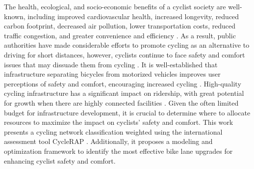 \documentclass[lettersize,journal]{IEEEtran}
\begin{document}
The health, ecological, and socio-economic benefits of a cyclist society are well-known, including improved cardiovascular health, increased longevity, reduced carbon footprint, decreased air pollution, lower transportation costs, reduced traffic congestion, and greater convenience and efficiency \cite{garrard2012health, gotschi2016cycling}. As a result, public authorities have made considerable efforts to promote cycling as an alternative to driving for short distances, however, cyclists continue to face safety and comfort issues that may dissuade them from cycling \cite{fishman2012barriers}. It is well-established that infrastructure separating bicycles from motorized vehicles improves user perceptions of safety and comfort, encouraging increased cycling \cite{lawrence2018cyclist, broach2012cyclists}. High-quality cycling infrastructure has a significant impact on ridership, with great potential for growth when there are highly connected facilities \cite{pucher2011walking, pucher2017cycling}. Given the often limited budget for infrastructure development, it is crucial to determine where to allocate resources to maximize the impact on cyclists' safety and comfort. This work presents a cycling network classification weighted using the international assessment tool CycleRAP \cite{cyclerap2024}. Additionally, it proposes a modeling and optimization framework to identify the most effective bike lane upgrades for enhancing cyclist safety and comfort.
\end{document}
